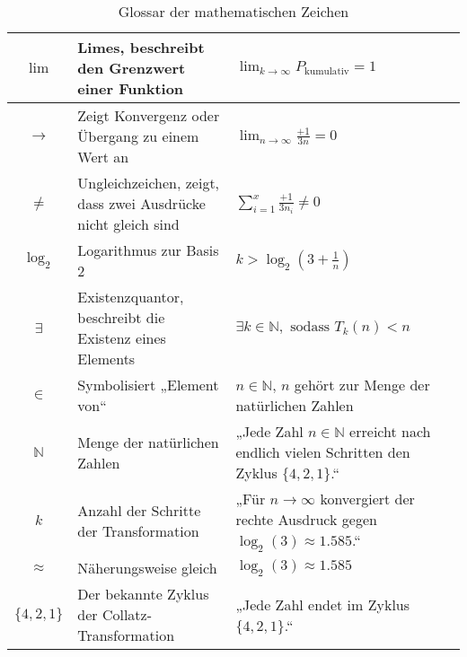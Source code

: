 \documentclass[a4paper,12pt]{article}
\begin{document}
\begin{table}[h!]
\begin{tabular}{|c|p{7cm}|p{5cm}|}
    \( \lim \) & Limes, beschreibt den Grenzwert einer Funktion & \( \lim_{k \to \infty} P_{\text{kumulativ}} = 1 \) \\ \hline
    \( \to \) & Zeigt Konvergenz oder Übergang zu einem Wert an & \( \lim_{n \to \infty} \frac{+1}{3n} = 0 \) \\ \hline
    \( \neq \) & Ungleichzeichen, zeigt, dass zwei Ausdrücke nicht gleich sind & \( \sum_{i=1}^x \frac{+1}{3n_i} \neq 0 \) \\ \hline
    \( \log_2 \) & Logarithmus zur Basis 2 & \( k > \log_2(3 + \frac{1}{n}) \) \\ \hline
    \( \exists \) & Existenzquantor, beschreibt die Existenz eines Elements & \( \exists k \in \mathbb{N}, \text{ sodass } T_k(n) < n \) \\ \hline
    \( \in \) & Symbolisiert „Element von“ & \( n \in \mathbb{N} \), \( n \) gehört zur Menge der natürlichen Zahlen \\ \hline
    \( \mathbb{N} \) & Menge der natürlichen Zahlen & „Jede Zahl \( n \in \mathbb{N} \) erreicht nach endlich vielen Schritten den Zyklus \( \{4, 2, 1\} \).“ \\ \hline
    \( k \) & Anzahl der Schritte der Transformation & „Für \( n \to \infty \) konvergiert der rechte Ausdruck gegen \( \log_2(3) \approx 1.585 \).“ \\ \hline
    \( \approx \) & Näherungsweise gleich & \( \log_2(3) \approx 1.585 \) \\ \hline
    \( \{4, 2, 1\} \) & Der bekannte Zyklus der Collatz-Transformation & „Jede Zahl endet im Zyklus \( \{4, 2, 1\} \).“ \\ \hline
    \end{tabular}
    \caption{Glossar der mathematischen Zeichen}
    \label{tab:glossar}
    \end{table}
    
\end{document}
